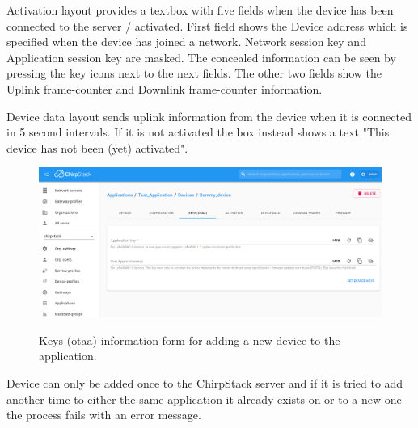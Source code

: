 Activation layout provides a textbox with five fields when the device has been connected to the server / activated.
First field shows the Device address which is specified when the device has joined a network.
Network session key and Application session key are masked.
The concealed information can be seen by pressing the key icons next to the next fields.
The other two fields show the Uplink frame-counter and Downlink frame-counter information.

Device data layout sends uplink information from the device when it is connected in 5 second intervals.
If it is not activated the box instead shows a text "This device has not been (yet) activated".

\clearpage

\begin{figure}[ht]
  \centering
  {\includegraphics[width=\textwidth]{illustration/ChirpStack_new_device_2.png}}
  \caption{Keys (\gls{otaa}) information form for adding a new device to the application.}
  \label{fig:ChirpStack_new_device_2}
\end{figure}

Device can only be added once to the ChirpStack server and if it is tried to add another time to either the same application it already exists on or to a new one the process fails with an error message.


\clearpage %
